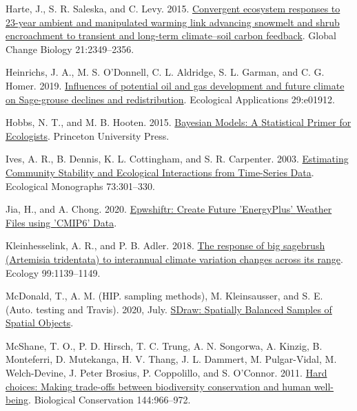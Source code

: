 \documentclass[
  12pt,
]{article}
\newlength{\cslhangindent}
\newlength{\cslentryspacingunit} %
\newenvironment{CSLReferences}[2] %
 {%
  \setlength{\parindent}{0pt}
  \ifodd #1
  \let\oldpar\par
  \def\par{\hangindent=\cslhangindent\oldpar}
  \fi
  \setlength{\parskip}{#2\cslentryspacingunit}
 }%
 {}
\begin{document}
\begin{CSLReferences}{1}{0}
\leavevmode{}%
Harte, J., S. R. Saleska, and C. Levy. 2015. \href{https://doi.org/10.1111/gcb.12831}{Convergent ecosystem responses to 23-year ambient and manipulated warming link advancing snowmelt and shrub encroachment to transient and long-term climate--soil carbon feedback}. Global Change Biology 21:2349--2356.

\leavevmode{}%
Heinrichs, J. A., M. S. O'Donnell, C. L. Aldridge, S. L. Garman, and C. G. Homer. 2019. \href{https://doi.org/10.1002/eap.1912}{Influences of potential oil and gas development and future climate on {Sage}-grouse declines and redistribution}. Ecological Applications 29:e01912.

\leavevmode{}%
Hobbs, N. T., and M. B. Hooten. 2015. \href{https://press.princeton.edu/books/hardcover/9780691159287/bayesian-models}{Bayesian {Models}: {A} {Statistical} {Primer} for {Ecologists}}. Princeton University Press.

\leavevmode{}%
Ives, A. R., B. Dennis, K. L. Cottingham, and S. R. Carpenter. 2003. \href{https://doi.org/10.1890/0012-9615(2003)073\%5B0301:ECSAEI\%5D2.0.CO;2}{Estimating {Community} {Stability} and {Ecological} {Interactions} from {Time}-{Series} {Data}}. Ecological Monographs 73:301--330.

\leavevmode{}%
Jia, H., and A. Chong. 2020. \href{https://CRAN.R-project.org/package=epwshiftr}{Epwshiftr: {Create} {Future} '{EnergyPlus}' {Weather} {Files} using '{CMIP6}' {Data}}.

\leavevmode{}%
Kleinhesselink, A. R., and P. B. Adler. 2018. \href{https://doi.org/10.1002/ecy.2191}{The response of big sagebrush ({Artemisia} tridentata) to interannual climate variation changes across its range}. Ecology 99:1139--1149.

\leavevmode{}%
McDonald, T., A. M. (HIP. sampling methods), M. Kleinsausser, and S. E. (Auto. testing and Travis). 2020, July. \href{https://CRAN.R-project.org/package=SDraw}{{SDraw}: {Spatially} {Balanced} {Samples} of {Spatial} {Objects}}.

\leavevmode{}%
McShane, T. O., P. D. Hirsch, T. C. Trung, A. N. Songorwa, A. Kinzig, B. Monteferri, D. Mutekanga, H. V. Thang, J. L. Dammert, M. Pulgar-Vidal, M. Welch-Devine, J. Peter Brosius, P. Coppolillo, and S. O'Connor. 2011. \href{https://doi.org/10.1016/j.biocon.2010.04.038}{Hard choices: {Making} trade-offs between biodiversity conservation and human well-being}. Biological Conservation 144:966--972.


\end{CSLReferences}
\end{document}
